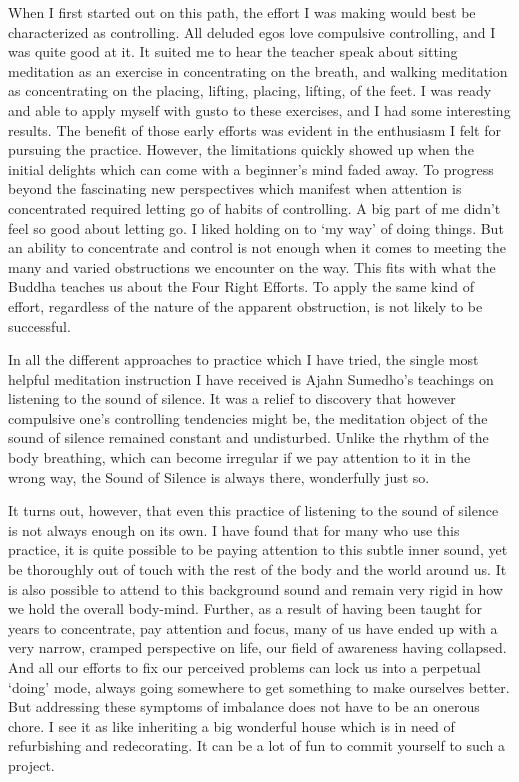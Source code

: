 When I first started out on this path, the effort I was making would
best be characterized as controlling. All deluded egos love compulsive
controlling, and I was quite good at it. It suited me to hear the
teacher speak about sitting meditation as an exercise in concentrating
on the breath, and walking meditation as concentrating on the placing,
lifting, placing, lifting, of the feet. I was ready and able to apply
myself with gusto to these exercises, and I had some interesting
results. The benefit of those early efforts was evident in the
enthusiasm I felt for pursuing the practice. However, the limitations
quickly showed up when the initial delights which can come with a
beginner’s mind faded away. To progress beyond the fascinating new
perspectives which manifest when attention is concentrated required
letting go of habits of controlling. A big part of me didn’t feel so
good about letting go. I liked holding on to ‘my way’ of doing things.
But an ability to concentrate and control is not enough when it comes to
meeting the many and varied obstructions we encounter on the way. This
fits with what the Buddha teaches us about the Four Right
Efforts.\cite{right-effort}
To apply the same kind of effort, regardless of the nature of the
apparent obstruction, is not likely to be successful.

In all the different approaches to practice which I have tried, the
single most helpful meditation instruction I have received is Ajahn
Sumedho’s teachings on listening to the sound of
silence.\cite{inner-listening,aj-sumedho-sound-of-silence}
It was a relief to discovery that however compulsive one’s controlling
tendencies might be, the meditation object of the sound of silence
remained constant and undisturbed. Unlike the rhythm of the body
breathing, which can become irregular if we pay attention to it in the
wrong way, the Sound of Silence is always there, wonderfully just so.

It turns out, however, that even this practice of listening to the sound
of silence is not always enough on its own. I have found that for many
who use this practice, it is quite possible to be paying attention to
this subtle inner sound, yet be thoroughly out of touch with the rest of
the body and the world around us. It is also possible to attend to this
background sound and remain very rigid in how we hold the overall
body-mind. Further, as a result of having been taught for years to
concentrate, pay attention and focus, many of us have ended up with a
very narrow, cramped perspective on life, our field of awareness having
collapsed. And all our efforts to fix our perceived problems can lock us
into a perpetual ‘doing’ mode, always going somewhere to get something
to make ourselves better. But addressing these symptoms of imbalance
does not have to be an onerous chore. I see it as like inheriting a big
wonderful house which is in need of refurbishing and redecorating. It
can be a lot of fun to commit yourself to such a project.

